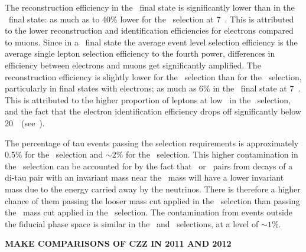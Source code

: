 The reconstruction efficiency in the \eeee\ final state is significantly lower
than in the \mmmm\ final state: as much as to 40\% lower for the \ZZs\ selection
at 7~\tev. This is attributed to the lower reconstruction and identification
efficiencies for electrons compared to muons. Since in a \fourlep\ final state
the average event level selection efficiency is the average
single lepton selection efficiency to the fourth power, differences in efficiency between electrons
and muons get significantly amplified. The reconstruction efficiency is 
slightly lower for the \ZZs\ selection than for the \ZZ\ selection, particularly
in final states with electrons; as much as
6\% in the \eeee\ final state at 7~\tev. This is attributed to the higher
proportion of leptons at low \pt\ in the \ZZs\ selection, and the fact that the
electron identification efficiency drops off significantly below
20~\gev\ (see~).

The percentage of tau events passing the selection requirements is approximately
0.5\% for the \ZZ\ selection and $\sim2\%$ for the \ZZs\ selection. This higher
contamination in the \ZZs\ selection can be accounted for by the fact that
\dielectron\ or \dimuon\ pairs from decays of a di-tau pair with an invariant mass
near the \Z\ mass will have a lower invariant mass due to the energy carried
away by the neutrinos. There is therefore a higher chance of them passing the
looser mass cut applied in the \ZZs\ selection than passing the \sstooos\ mass
cut applied in the \ZZ\ selection. The contamination from events outside the
fiducial phase space is similar in the \ZZ\ and \ZZs\ selections, at a level of
$\sim1\%$.

{\bf MAKE COMPARISONS OF CZZ IN 2011 AND 2012}



